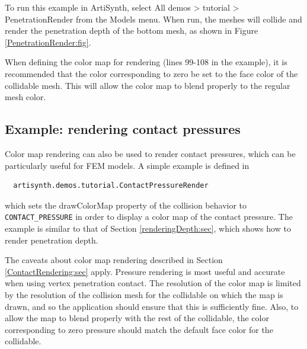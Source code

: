 To run this example in ArtiSynth, select {\sf All demos > tutorial >
PenetrationRender} from the {\sf Models} menu. When run, the meshes
will collide and render the penetration depth of the bottom mesh, 
as shown in Figure \ref{PenetrationRender:fig}.

\begin{sideblock}
When defining the color map for rendering (lines 99-108 in the
example), it is recommended that the color corresponding to zero be
set to the face color of the collidable mesh.  This will allow
the color map to blend properly to the regular mesh color.
\end{sideblock}

\subsection{Example: rendering contact pressures}
\label{renderingContactPressure:sec}

Color map rendering can also be used to render contact pressures,
which can be particularly useful for FEM models. A simple example is
defined in
%
\begin{verbatim}
  artisynth.demos.tutorial.ContactPressureRender
\end{verbatim}
%
which sets the {\sf drawColorMap} property of the collision behavior to {\tt
CONTACT\_PRESSURE} in order to display a color map of the contact
pressure. The example is similar to that
of Section \ref{renderingDepth:sec}, which shows how to render
penetration depth.

\begin{sideblock}
The caveats about color map rendering described in Section
\ref{ContactRendering:sec} apply. 
Pressure rendering is most useful and accurate when using vertex penetration
contact. The resolution of the color map is limited by
the resolution of the collision mesh for the collidable on which the
map is drawn, and so the application should ensure that this is
sufficiently fine. Also, to allow the map to blend properly with the
rest of the collidable, the color corresponding to zero pressure
should match the default face color for the collidable.
\end{sideblock}

